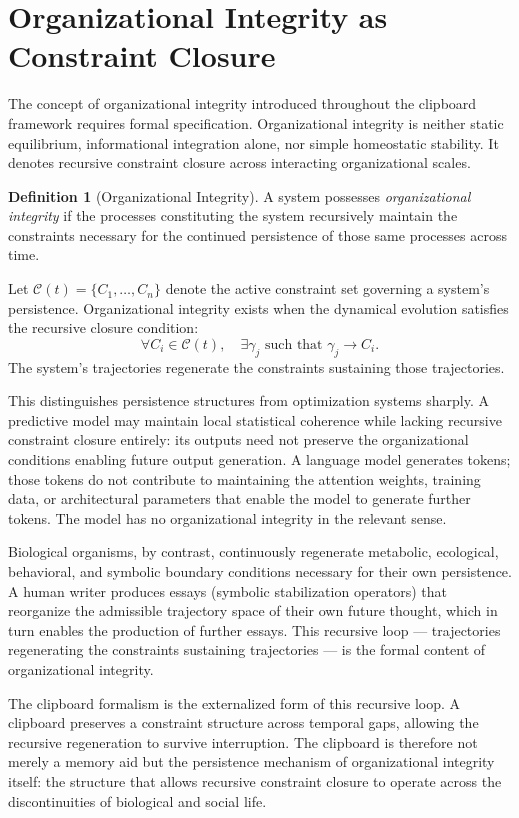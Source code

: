 \documentclass[12pt,oneside]{book}
\theoremstyle{plain}
\theoremstyle{definition}
\newtheorem{definition}[theorem]{Definition}
\theoremstyle{plain}
\begin{document}
\section{Organizational Integrity as Constraint Closure}

The concept of organizational integrity introduced throughout the clipboard framework requires formal specification. Organizational integrity is neither static equilibrium, informational integration alone, nor simple homeostatic stability. It denotes recursive constraint closure across interacting organizational scales.

\begin{definition}[Organizational Integrity]
A system possesses \emph{organizational integrity} if the processes constituting the system recursively maintain the constraints necessary for the continued persistence of those same processes across time.
\end{definition}

Let $\mathcal{C}(t) = \{C_1, \ldots, C_n\}$ denote the active constraint set governing a system's persistence. Organizational integrity exists when the dynamical evolution satisfies the recursive closure condition:
\[
\forall C_i \in \mathcal{C}(t), \quad \exists \gamma_j \text{ such that } \gamma_j \to C_i.
\]
The system's trajectories regenerate the constraints sustaining those trajectories.

This distinguishes persistence structures from optimization systems sharply. A predictive model may maintain local statistical coherence while lacking recursive constraint closure entirely: its outputs need not preserve the organizational conditions enabling future output generation. A language model generates tokens; those tokens do not contribute to maintaining the attention weights, training data, or architectural parameters that enable the model to generate further tokens. The model has no organizational integrity in the relevant sense.

Biological organisms, by contrast, continuously regenerate metabolic, ecological, behavioral, and symbolic boundary conditions necessary for their own persistence. A human writer produces essays (symbolic stabilization operators) that reorganize the admissible trajectory space of their own future thought, which in turn enables the production of further essays. This recursive loop — trajectories regenerating the constraints sustaining trajectories — is the formal content of organizational integrity.

The clipboard formalism is the externalized form of this recursive loop. A clipboard preserves a constraint structure across temporal gaps, allowing the recursive regeneration to survive interruption. The clipboard is therefore not merely a memory aid but the persistence mechanism of organizational integrity itself: the structure that allows recursive constraint closure to operate across the discontinuities of biological and social life.
\end{document}
